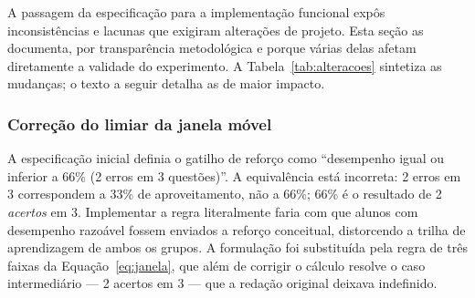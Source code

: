 \documentclass[10pt, a4paper, twocolumn]{article}
\begin{document}
A passagem da especificação para a implementação funcional expôs
inconsistências e lacunas que exigiram alterações de projeto. Esta seção as
documenta, por transparência metodológica e porque várias delas afetam
diretamente a validade do experimento. A Tabela~\ref{tab:alteracoes} sintetiza
as mudanças; o texto a seguir detalha as de maior impacto.

\begin{table}[H]
\centering
\small
\caption{Alterações aplicadas em relação à especificação inicial}
\label{tab:alteracoes}
\vspace{0.13cm}
\end{table}

\subsubsection{Correção do limiar da janela móvel}

A especificação inicial definia o gatilho de reforço como ``desempenho igual ou
inferior a 66\% (2 erros em 3 questões)''. A equivalência está incorreta: 2 erros
em 3 correspondem a 33\% de aproveitamento, não a 66\%; 66\% é o resultado de 2
\textit{acertos} em 3. Implementar a regra literalmente faria com que alunos com
desempenho razoável fossem enviados a reforço conceitual, distorcendo a trilha de
aprendizagem de ambos os grupos. A formulação foi substituída pela regra de três
faixas da Equação~\ref{eq:janela}, que além de corrigir o cálculo resolve o caso
intermediário --- 2 acertos em 3 --- que a redação original deixava indefinido.
\end{document}
